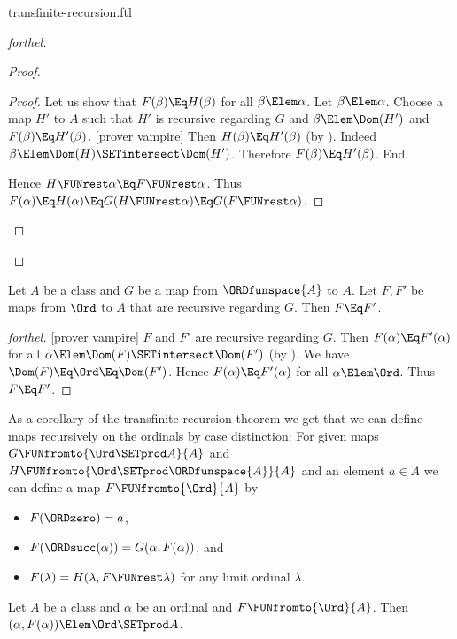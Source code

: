 \documentclass{stex}
\begin{document}
\begin{smodule}{transfinite-recursion.ftl}
\begin{proof}[forthel]
\begin{proof}
\begin{proof}
      Let us show that $F(\beta) \Eq H(\beta)$ for all $\beta \Elem \alpha$.
        Let $\beta \Elem \alpha$.
        Choose a map $H'$ to $A$ such that $H'$ is recursive regarding $G$ and $\beta \Elem \Dom(H')$ and $F(\beta) \Eq H'(\beta)$.
        [prover vampire]
        Then $H(\beta) \Eq H'(\beta)$ (by ).
        Indeed $\beta \Elem \Dom(H) \SETintersect \Dom(H')$.
        Therefore $F(\beta) \Eq H'(\beta)$.
      End.

      Hence $H \FUNrest \alpha \Eq F \FUNrest \alpha$.
      Thus $F(\alpha)
        \Eq H(\alpha)
        \Eq G(H \FUNrest \alpha)
        \Eq G(F \FUNrest \alpha)$.
    \end{proof}
  \end{proof}
\end{proof}

\begin{theorem}[forthel,title=Transfinite Recursion: Uniqueness]
  Let $A$ be a class and $G$ be a map from $\ORDfunspace{A}$ to $A$.
  Let $F, F'$ be maps from $\Ord$ to $A$ that are recursive regarding $G$.
  Then $F \Eq F'$.
\end{theorem}
\begin{proof}[forthel]
  [prover vampire]
  $F$ and $F'$ are recursive regarding $G$.
  Then $F(\alpha) \Eq F'(\alpha)$ for all $\alpha \Elem \Dom(F) \SETintersect \Dom(F')$ (by ).
  We have $\Dom(F) \Eq \Ord \Eq \Dom(F')$.
  Hence $F(\alpha) \Eq F'(\alpha)$ for all $\alpha \Elem \Ord$.
  Thus $F \Eq F'$.
\end{proof}

As a corollary of the transfinite recursion theorem we get that we can
define maps recursively on the ordinals by case distinction:
For given maps $G \FUNfromto{\Ord \SETprod A}{A}$ and
$H \FUNfromto{\Ord \SETprod \ORDfunspace{A}}{A}$ and an element $a \in A$ we
can define a map $F \FUNfromto{\Ord}{A}$ by
\begin{itemize}
  \item $F(\ORDzero) = a$,
  \item $F(\ORDsucc(\alpha)) = G(\alpha, F(\alpha))$, and
  \item $F(\lambda) = H(\lambda, F \FUNrest \lambda)$
    for any limit ordinal $\lambda$.
\end{itemize}

\begin{lemma}[forthel]
  Let $A$ be a class and $\alpha$ be an ordinal and $F \FUNfromto{\Ord}{A}$.
  Then $(\alpha, F(\alpha)) \Elem \Ord \SETprod A$.
\end{lemma}


\end{smodule}
\end{document}
